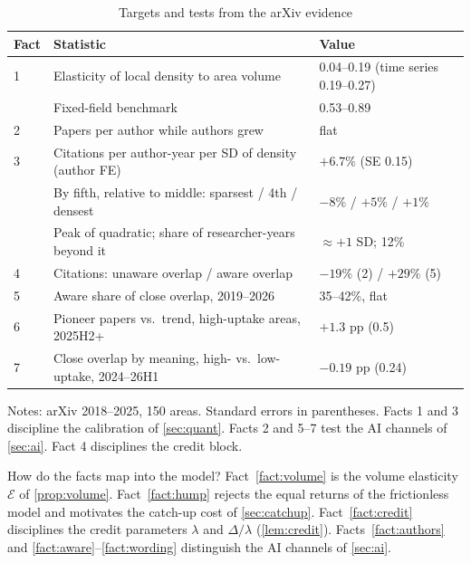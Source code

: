 \begin{table}[t]
\centering
\small
\caption{Targets and tests from the arXiv evidence}\label{tab:facts}
\begin{tabularx}{\textwidth}{@{}lXl@{}}
\toprule
Fact & Statistic & Value \\
\midrule
1 & Elasticity of local density to area volume & 0.04--0.19 (time series 0.19--0.27) \\
  & Fixed-field benchmark & 0.53--0.89 \\
2 & Papers per author while authors grew & flat \\
3 & Citations per author-year per SD of density (author FE) & $+6.7\%$ (SE 0.15) \\
  & By fifth, relative to middle: sparsest / 4th / densest & $-8\%$ / $+5\%$ / $+1\%$ \\
  & Peak of quadratic; share of researcher-years beyond it & $\approx+1$ SD; 12\% \\
4 & Citations: unaware overlap / aware overlap & $-19\%$ (2) / $+29\%$ (5) \\
5 & Aware share of close overlap, 2019--2026 & 35--42\%, flat \\
6 & Pioneer papers vs.\ trend, high-uptake areas, 2025H2+ & $+1.3$ pp (0.5) \\
7 & Close overlap by meaning, high- vs.\ low-uptake, 2024--26H1 & $-0.19$ pp (0.24) \\
\bottomrule
\end{tabularx}
\begin{minipage}{\textwidth}\footnotesize\smallskip
Notes: arXiv 2018--2025, 150 areas. Standard errors in parentheses. Facts 1 and
3 discipline the calibration of \cref{sec:quant}. Facts 2 and 5--7 test the AI
channels of \cref{sec:ai}. Fact 4 disciplines the credit block.
\end{minipage}
\end{table}

How do the facts map into the model? Fact~\ref{fact:volume} is the volume
elasticity $\mathcal E$ of \cref{prop:volume}. Fact~\ref{fact:hump} rejects the
equal returns of the frictionless model and motivates the catch-up cost of
\cref{sec:catchup}. Fact~\ref{fact:credit} disciplines the credit parameters $\lambda$ and
$\Delta/\lambda$ (\cref{lem:credit}). Facts~\ref{fact:authors} and
\ref{fact:aware}--\ref{fact:wording} distinguish the AI channels of \cref{sec:ai}.
